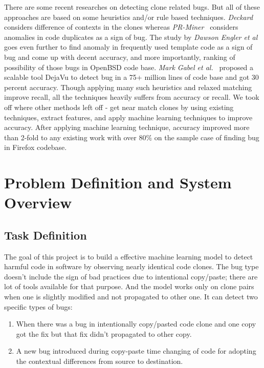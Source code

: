 \documentclass[11pt]{article}
\begin{document}
\vspace{10 pt}
There are some recent researches on detecting clone related bugs. But all of these approaches are based on some heuristics and/or rule based techniques. \emph{Deckard}~\cite{Jiang2007} considers difference of contexts in the clones whereas \emph{PR-Miner}~\cite{Li2005} considers anomalies in code duplicates as a sign of bug. The study by \emph{Dawson Engler et al}~\cite{Engler2001} goes even further to find anomaly in frequently used template code as a sign of bug and come up with decent accuracy, and more importantly, ranking of possibility of those bugs in OpenBSD code base. \emph{Mark Gabel et al.}~\cite{Gabel2010} proposed a scalable tool DejaVu to detect bug in a 75+ million lines of code base and got 30 percent accuracy. Though applying many such heuristics and relaxed matching improve recall, all the techniques heavily suffers from accuracy or recall. We took off where other methods left off - get near match clones by using existing techniques, extract features, and apply machine learning techniques to improve accuracy. After applying machine learning technique, accuracy improved more than 2-fold to any existing work with over $80\%$ on the sample case of finding bug in Firefox codebase.

\section{Problem Definition and System Overview}
\subsection{Task Definition}
The goal of this project is to build a effective machine learning model to detect harmful code in software by observing nearly identical code clones. The bug type doesn’t include the sign of bad practices due to intentional copy/paste; there are lot of tools available for that purpose. And the model works only on clone pairs when one is slightly modified and not propagated to other one. It can detect two specific types of bugs:

\begin{enumerate}
\item When there was a bug in intentionally copy/pasted code clone and one copy got the fix but that fix didn’t propagated to other copy.
\item A new bug introduced during copy-paste time changing of code for adopting the contextual differences from source to destination.
\end{enumerate}
\end{document}

